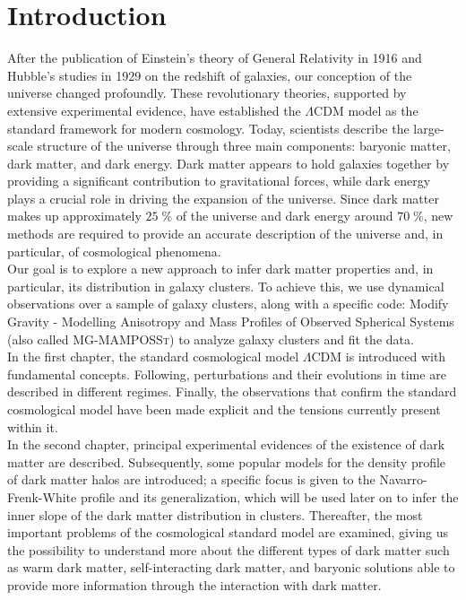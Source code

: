 \chapter*{Introduction}

After the publication of Einstein's theory of General Relativity in 1916 and Hubble's studies in 1929 on the redshift of galaxies, our conception of the universe changed profoundly. 
These revolutionary theories, supported by extensive experimental evidence, have established the $\Lambda$CDM model as the standard framework for modern cosmology. Today, scientists describe the large-scale structure of the universe through three main components: baryonic matter, dark matter, and dark energy. Dark matter appears to hold galaxies together by providing a significant contribution to gravitational forces, while dark energy plays a crucial role in driving the expansion of the universe. Since dark matter makes up approximately $25\;\%$ of the universe and dark energy around $70\;\%$, new methods are required to provide an accurate description of the universe and, in particular, of cosmological phenomena.\\
Our goal is to explore a new approach to infer dark matter properties and, in particular, its distribution in galaxy clusters. To achieve this, we use dynamical observations over a sample of galaxy clusters, along with a specific code: Modify Gravity - Modelling Anisotropy and Mass Profiles of Observed Spherical Systems (also called \textsc{MG-MAMPOSSt}) to analyze galaxy clusters and fit the data.\\ In the first chapter, the standard cosmological model $\Lambda$CDM is introduced with fundamental concepts. Following, perturbations and their evolutions in time are described in different regimes. Finally, the observations that confirm the standard cosmological model have been made explicit and the tensions currently present within it.\\
In the second chapter, principal experimental evidences of the existence of dark matter are described. Subsequently, some popular models for the density profile of dark matter halos are introduced; a specific focus is given to the  Navarro-Frenk-White profile and its generalization, which will be used later on to infer the inner slope of the dark matter distribution in clusters. Thereafter, the most important problems of the cosmological standard model are examined, giving us the possibility to understand more about the different types of dark matter such as warm dark matter, self-interacting dark matter, and baryonic solutions able to provide more information through the interaction with dark matter.\\

